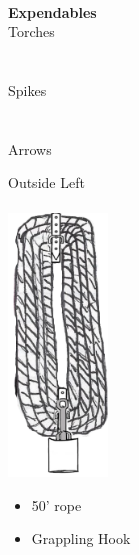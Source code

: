 \documentclass[11pt]{article}
\begin{document}
\\
\begin{minipage}[t]{.4\textwidth}
\vspace{0.6cm}
{\huge \textbf{\Fontauri Expendables}}\\
\Large{\textcolor{OCRA}{Torches}}\\
    \\
    \\
\Large{\textcolor{OCRA}{Spikes}}\\
\\
\\
\Large{\textcolor{OCRA}{Arrows}}\\
\end{minipage}
\newpage
\hspace{0.04\textwidth}
\begin{minipage}[t]{.248\textwidth}
    \normalsize{Outside Left}\\
    \\
    \includegraphics[height=7.0cm]{img/rope.png}\\
    \begin{normalsize}
        \begin{itemize}[topsep=0pt, itemsep=0pt, partopsep=0pt, parsep=0pt]
            \item 50' rope
            \item Grappling Hook
        \end{itemize}
        \end{normalsize}
\end{minipage}
\end{document}
